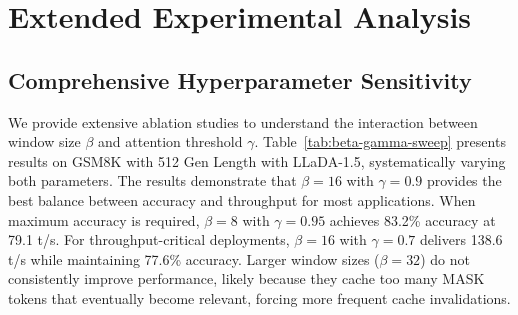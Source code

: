 \documentclass{article} %
\theoremstyle{definition}
\theoremstyle{remark}
\begin{document}

\section{Extended Experimental Analysis}

\subsection{Comprehensive Hyperparameter Sensitivity}

We provide extensive ablation studies to understand the interaction between window size $\beta$ and attention threshold $\gamma$. Table~\ref{tab:beta-gamma-sweep} presents results on GSM8K with 512 Gen Length with LLaDA-1.5, systematically varying both parameters. The results demonstrate that $\beta=16$ with $\gamma=0.9$ provides the best balance between accuracy and throughput for most applications. When maximum accuracy is required, $\beta=8$ with $\gamma=0.95$ achieves 83.2\% accuracy at 79.1 t/s. For throughput-critical deployments, $\beta=16$ with $\gamma=0.7$ delivers 138.6 t/s while maintaining 77.6\% accuracy. Larger window sizes ($\beta=32$) do not consistently improve performance, likely because they cache too many MASK tokens that eventually become relevant, forcing more frequent cache invalidations.

\begin{table}[!htbp]
\centering
\caption{Joint sensitivity analysis of window size $\beta$ and attention threshold $\gamma$ on GSM8K with 512 Gen Length (LLaDA-1.5). Each cell shows accuracy (top) and throughput in t/s (bottom).}
\label{tab:beta-gamma-sweep}
\vspace{-0.1in}
\end{table}
\end{document}

